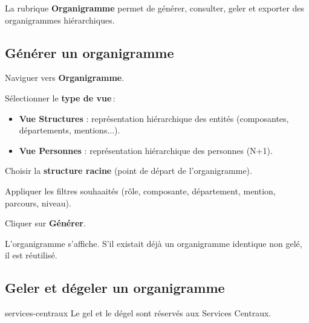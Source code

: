 La rubrique \textbf{Organigramme} permet de g\'en\'erer, consulter, geler et exporter des organigrammes hi\'erarchiques.

\subsection{G\'en\'erer un organigramme}

\begin{steps}
  \item Naviguer vers \textbf{Organigramme}.
  \item S\'electionner le \textbf{type de vue}\,:
    \begin{itemize}
      \item \textbf{Vue Structures} : repr\'esentation hi\'erarchique des entit\'es (composantes, d\'epartements, mentions...).
      \item \textbf{Vue Personnes} : repr\'esentation hi\'erarchique des personnes (N+1).
    \end{itemize}
  \item Choisir la \textbf{structure racine} (point de d\'epart de l'organigramme).
  \item Appliquer les filtres souhaait\'es (r\^ole, composante, d\'epartement, mention, parcours, niveau).
  \item Cliquer sur \textbf{G\'en\'erer}.
  \item L'organigramme s'affiche. S'il existait d\'ej\`a un organigramme identique non gel\'e, il est r\'eutilis\'e.
\end{steps}



\subsection{Geler et d\'egeler un organigramme}

\begin{rolebox}{services-centraux}
  Le gel et le d\'egel sont r\'eserv\'es aux Services Centraux.
\end{rolebox}

